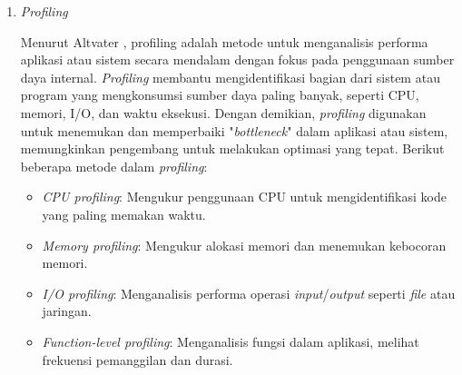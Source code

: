 \documentclass[12pt]{article}
\begin{document}
\begin{enumerate}
\begin{enumerate}
            \item \textit{Profiling}
            \par Menurut Altvater \cite{3.2.4Altvater2023}, profiling adalah metode untuk menganalisis performa aplikasi atau sistem secara mendalam dengan fokus pada penggunaan sumber daya internal. \textit{Profiling} membantu mengidentifikasi bagian dari sistem atau program yang mengkonsumsi sumber daya paling banyak, seperti CPU, memori, I/O, dan waktu eksekusi. Dengan demikian, \textit{profiling} digunakan untuk menemukan dan memperbaiki "\textit{bottleneck}" dalam aplikasi atau sistem, memungkinkan pengembang untuk melakukan optimasi yang tepat. Berikut beberapa metode dalam \textit{profiling}:
            \begin{itemize}
                \item \textit{CPU profiling}: Mengukur penggunaan CPU untuk mengidentifikasi kode yang paling memakan waktu.
                \item \textit{Memory profiling}: Mengukur alokasi memori dan menemukan kebocoran memori. 
                \item \textit{I/O profiling}: Menganalisis performa operasi \textit{input}/\textit{output} seperti \textit{file} atau jaringan.
                \item \textit{Function-level profiling}: Menganalisis fungsi dalam aplikasi, melihat frekuensi pemanggilan dan durasi.
            \end{itemize}
            

\end{enumerate}
\end{enumerate}
\end{document}

